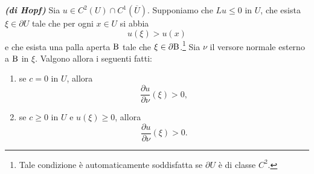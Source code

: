 \begin{lemma}\textbf{\emph{(di Hopf)}}
	Sia $u \in C^2(U)\cap C^1(\overline{U})$. Supponiamo che $Lu \le 0$ in $U$, che esista $\xi \in \partial U$ tale che per ogni $x \in U$ si abbia
	\[ u(\xi ) > u(x) \]
	e che esista una palla aperta $\textup{B}$ tale che $\xi \in \partial \textup{B}$.\footnote{Tale condizione è automaticamente soddisfatta se $\partial U$ è di classe $C^2$.} Sia $\nu$ il versore normale esterno a $\textup{B}$ in $\xi$.  Valgono allora i seguenti fatti:
	\begin{enumerate}[$(a)$]
		\item se $c = 0 $ in $U$, allora
		\[ \frac{\partial u}{\partial \nu}(\xi) > 0, \]
		\item se $c \ge 0$ in $U$ e $u(\xi) \ge 0$, allora
		\[ \frac{\partial u}{\partial \nu}(\xi) > 0. \]
	\end{enumerate} 
\end{lemma}
